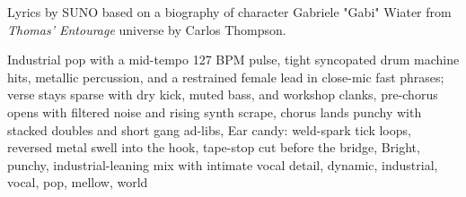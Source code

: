 
\begin{notes}
Lyrics by SUNO based on a biography of character Gabriele "Gabi" Wiater from \emph{Thomas’ Entourage} universe by Carlos Thompson.
\end{notes}
\begin{style}
Industrial pop with a mid-tempo 127 BPM pulse, tight syncopated drum machine hits, metallic percussion, and a restrained female lead in close-mic fast phrases; verse stays sparse with dry kick, muted bass, and workshop clanks, pre-chorus opens with filtered noise and rising synth scrape, chorus lands punchy with stacked doubles and short gang ad-libs, Ear candy: weld-spark tick loops, reversed metal swell into the hook, tape-stop cut before the bridge, Bright, punchy, industrial-leaning mix with intimate vocal detail, dynamic, industrial, vocal, pop, mellow, world
\end{style}

